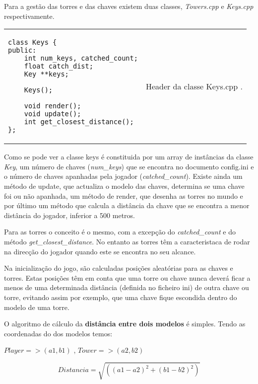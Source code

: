 Para a gestão das torres e das chaves existem duas classes, \textit{Towers.cpp} e \textit{Keys.cpp} respectivamente.

\-
\begin{center}
\begin{tabular} {l | p{10cm}}
\begin{lstlisting}
class Keys {
public:
    int num_keys, catched_count;
    float catch_dist;
    Key **keys;

    Keys();

    void render();
    void update();
    int get_closest_distance();
};
\end{lstlisting} 
& 
Header da classe Keys.cpp .
\end{tabular}
\end{center}
\-
Como se pode ver a classe keys é constituida por um array de instâncias da classe \emph{Key}, um número de chaves (\emph{num\_keys}) que se encontra no documento config.ini e o número de chaves apanhadas pela jogador (\emph{catched\_count}).
Existe ainda um método de update, que actualiza o modelo das chaves, determina se uma chave foi ou não apanhada, um método de render, que desenha as torres no mundo e por último um método que calcula a distância da chave que se encontra a menor distância do jogador, inferior a 500 metros.

Para as torres o conceito é o mesmo, com a excepção do \emph{catched\_count} e do método \emph{get\_closest\_distance}.
No entanto as torres têm a caracteristaca de rodar na direcção do jogador quando este se encontra no seu alcance.

Na inicialização do jogo, são calculadas posições aleatórias para as chaves e torres. Estas posições têm em conta que uma torre ou chave nunca deverá ficar a menos de uma determinada distância (definida no ficheiro ini) de outra chave ou torre, evitando assim por exemplo, que uma chave fique escondida dentro do modelo de uma torre.

O algoritmo de cálculo da {\bf distância entre dois modelos} é simples. Tendo as coordenadas do dos modelos temos:

\begin{center}
\begin{math}
Player => (a1,b1)
\end{math}
,
\begin{math}
Tower => (a2,b2)
\end{math}

\begin{equation}
Distancia = \sqrt{((a1-a2)^2+(b1-b2)^2)}
\end{equation}
\end{center}


